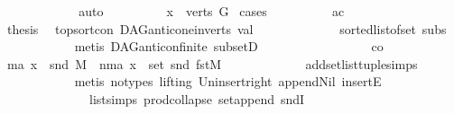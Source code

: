 \begin{isabellebody}
\ \ \ \ \ \ \ \ \isamarkupfalse%
\ {}\ \isamarkupfalse%
\ auto\isanewline
\ \ \ \ \ \ \isamarkupfalse%
\ \isamarkupfalse%
\ {\isachardoublequoteopen}x\ {\isasymin}\ verts\ G{\isachardoublequoteclose}\ \isamarkupfalse%
{\isacharparenleft}{\kern0pt}cases{\isacharparenright}{\kern0pt}\isanewline
\ \ \ \ \ \ \ \ \isamarkupfalse%
\ ac\isanewline
\ \ \ \ \ \ \ \ \isamarkupfalse%
\ \isamarkupfalse%
\ {\isacharquery}{\kern0pt}thesis\ \isamarkupfalse%
\ top{\isacharunderscore}{\kern0pt}sort{\isacharunderscore}{\kern0pt}con\ DAG{\isachardot}{\kern0pt}anticone{\isacharunderscore}{\kern0pt}in{\isacharunderscore}{\kern0pt}verts\ val\ \isanewline
\ \ \ \ \ \ \ \ \ \ \ \ sorted{\isacharunderscore}{\kern0pt}list{\isacharunderscore}{\kern0pt}of{\isacharunderscore}{\kern0pt}set{\isacharparenleft}{\kern0pt}{}{\isacharparenright}{\kern0pt}\ subs\isanewline
\ \ \ \ \ \ \ \ \ \ \isamarkupfalse%
\ {\isacharparenleft}{\kern0pt}metis\ DAG{\isachardot}{\kern0pt}anticon{\isacharunderscore}{\kern0pt}finite\ subsetD{\isacharparenright}{\kern0pt}\ \isanewline
\ \ \ \ \ \ \isamarkupfalse%
\isanewline
\ \ \ \ \ \ \ \ \isamarkupfalse%
\ co\isanewline
\ \ \ \ \ \ \ \ \isamarkupfalse%
\ \isamarkupfalse%
\ {\isacharparenleft}{\kern0pt}ma{\isacharparenright}{\kern0pt}\ {\isachardoublequoteopen}x\ {\isacharequal}{\kern0pt}\ snd\ M{\isachardoublequoteclose}\ {\isacharbar}{\kern0pt}\ {\isacharparenleft}{\kern0pt}nma{\isacharparenright}{\kern0pt}\ {\isachardoublequoteopen}x\ {\isasymin}\ set\ {\isacharparenleft}{\kern0pt}snd{\isacharparenleft}{\kern0pt}\ fst{\isacharparenleft}{\kern0pt}M{\isacharparenright}{\kern0pt}{\isacharparenright}{\kern0pt}{\isacharparenright}{\kern0pt}{\isachardoublequoteclose}\ \isanewline
\ \ \ \ \ \ \ \ \ \ \isamarkupfalse%
\ add{\isacharunderscore}{\kern0pt}set{\isacharunderscore}{\kern0pt}list{\isacharunderscore}{\kern0pt}tuple{\isachardot}{\kern0pt}simps\isanewline
\ \ \ \ \ \ \ \ \ \ \isamarkupfalse%
\ {\isacharparenleft}{\kern0pt}metis\ {\isacharparenleft}{\kern0pt}no{\isacharunderscore}{\kern0pt}types{\isacharcomma}{\kern0pt}\ lifting{\isacharparenright}{\kern0pt}\ Un{\isacharunderscore}{\kern0pt}insert{\isacharunderscore}{\kern0pt}right\ append{\isacharunderscore}{\kern0pt}Nil{}\ insertE\isanewline
\ \ \ \ \ \ \ \ \ \ \ \ \ \ list{\isachardot}{\kern0pt}simps{\isacharparenleft}{\kern0pt}{}{}{\isacharparenright}{\kern0pt}\ prod{\isachardot}{\kern0pt}collapse\ set{\isacharunderscore}{\kern0pt}append\ sndI{\isacharparenright}{\kern0pt}\ \isanewline

\end{isabellebody}
